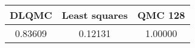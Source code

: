 \begin{tabular}{|c|c|c|}
\hline
DLQMC&Least squares&QMC 128\\ 
\hline

0.83609 & 0.12131 & 1.00000\\ 
\hline
\end{tabular}

